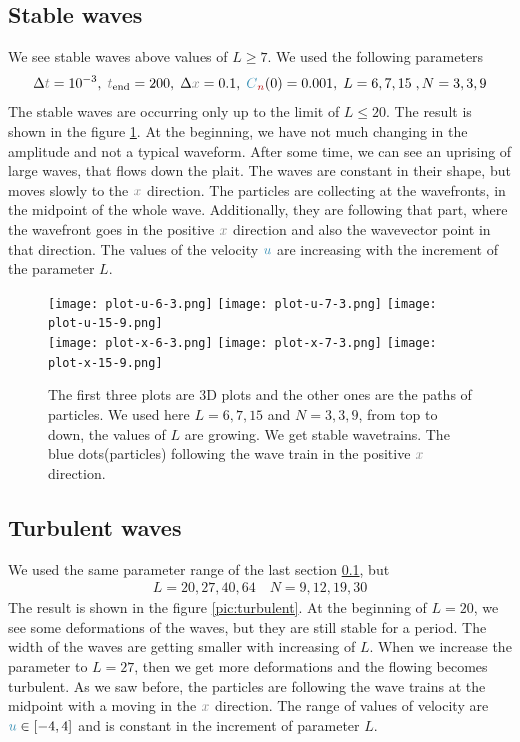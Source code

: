 \documentclass[10pt,fleqn, %
reqno,a4paper]{article}
\makeatletter
\def\mathcolor#1#{\@mathcolor{#1}}
\def\@mathcolor#1#2#3{%
        \protect\leavevmode
        \begingroup\color#1{#2}#3\endgroup
}
\newcommand{\nx}{\mathcolor{gray}{x}}
\newcommand{\nt}{\mathcolor{gray}{t}}
\newcommand{\nnu}{\mathcolor{cyan!70!black}{u}}
\newcommand{\nn}{\mathcolor{red!70!black}{n}}
\newcommand{\nC}{\mathcolor{cyan!70!black}{C}}
\makeatother
\begin{document}
\subsection{Stable waves} \label{sec:stable}
We see stable waves above values of $ L \geq 7 $.
We used the following parameters
\begin{align*}
        \Delta \nt = 10^{-3},\; \nt_{\mathrm{end}} = 200,\; \Delta \nx = 0.1,\; \nC_{\nn}(0) =  0.001,\;  L = 6, 7, 15\;, N = 3, 3, 9
\end{align*}
The stable waves are occurring only up to the limit of $ L \leq 20 $.
The result is shown in the figure \ref{pic:stable}.
At the beginning, we have not much changing in the amplitude and not a typical waveform.
After some time, we can see an uprising of large waves, that flows down the plait.
The waves are constant in their shape, but moves slowly to the $ \nx $ direction.
The particles are collecting at the wavefronts, in the midpoint of the whole wave. 
Additionally, they are following that part, where the wavefront goes in the positive $ \nx $ direction and also the wavevector point in that direction.
The values of the velocity $ \nnu $ are increasing with the increment of the parameter $ L $.
\begin{figure}[htp!]
        \begin{center}
                \texttt{[image: plot-u-6-3.png]}
                \texttt{[image: plot-u-7-3.png]}
                \texttt{[image: plot-u-15-9.png]}\\
                \texttt{[image: plot-x-6-3.png]}
                \texttt{[image: plot-x-7-3.png]}
                \texttt{[image: plot-x-15-9.png]}
                \caption{The first three plots are 3D plots and the other ones are the paths of particles. We used here $ L = 6, 7, 15 $ and $ N = 3, 3, 9$, from top to down, the values of $ L $ are growing. We get stable wavetrains. The blue dots(particles) following the wave train in the positive $ \nx $ direction. }
                \label{pic:stable}
        \end{center}
\end{figure}

\newpage

\subsection{Turbulent waves}\label{sec:turbulent}
We used the same parameter range of the last section \ref{sec:stable}, but
\begin{align*}
         L = 20, 27, 40, 64 \quad N = 9, 12, 19, 30
\end{align*} 
The result is shown in the figure \ref{pic:turbulent}.
At the beginning of $ L = 20 $, we see some deformations of the waves, but they are still stable for a period.
The width of the waves are getting smaller with increasing of $ L $. 
When we increase the parameter to $ L = 27  $, then we get more deformations and the flowing becomes turbulent. 
As we saw before, the particles are following the wave trains at the midpoint with a moving in the $ \nx $ direction. 
The range of values of velocity are $ \nnu \in [-4,4] $ and is constant in the increment of parameter $ L $. 
\end{document}
